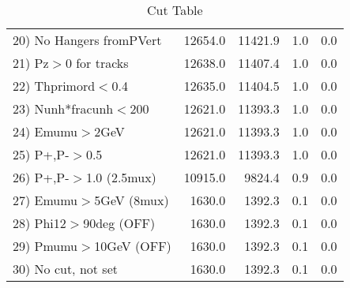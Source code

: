 \begin{table}[h!]
\begin{tabular}{||l||r|r|r|r||}
 20) No Hangers fromPVert &     12654.0 &     11421.9 &         1.0 &         0.0 \\
 21) Pz$>$0 for tracks    &     12638.0 &     11407.4 &         1.0 &         0.0 \\
 22) Thprimord$<$0.4      &     12635.0 &     11404.5 &         1.0 &         0.0 \\
 23) Nunh*fracunh$<$200   &     12621.0 &     11393.3 &         1.0 &         0.0 \\
 24) Emumu$>$2GeV         &     12621.0 &     11393.3 &         1.0 &         0.0 \\
 25) P+,P-$>$0.5          &     12621.0 &     11393.3 &         1.0 &         0.0 \\
 26) P+,P-$>$1.0 (2.5mux) &     10915.0 &      9824.4 &         0.9 &         0.0 \\
 27) Emumu$>$5GeV  (8mux) &      1630.0 &      1392.3 &         0.1 &         0.0 \\
 28) Phi12$>$90deg  (OFF) &      1630.0 &      1392.3 &         0.1 &         0.0 \\
 29) Pmumu$>$10GeV  (OFF) &      1630.0 &      1392.3 &         0.1 &         0.0 \\
 30) No cut, not set      &      1630.0 &      1392.3 &         0.1 &         0.0 \\
 \hline
 \hline
 \end{tabular}
 \caption{Cut Table \cohjp  }
 \label{tab-cut__jpsi}
 \end{table}
